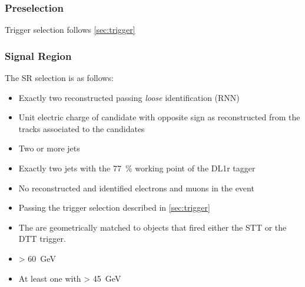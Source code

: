 \subsubsection{Preselection}

Trigger selection follows \cref{sec:trigger}

\subsubsection{Signal Region}

The SR selection is as follows:
\begin{itemize}
\item Exactly two reconstructed \tauhadvis passing \textit{loose} identification
  (RNN)

\item Unit electric charge of \tauhadvis candidate with opposite sign as
  reconstructed from the tracks associated to the \tauhadvis candidates

\item Two or more jets

\item Exactly two \btagged jets with the \SI{77}{\percent} working point of the
  DL1r tagger

\item No reconstructed and identified electrons and muons in the event

\item Passing the trigger selection described in \cref{sec:trigger}

\item The \tauhadvis are geometrically matched to objects that fired either the
  STT or the DTT trigger.

\item \mMMC > \SI{60}{\GeV}

\item At least one \bjet with \pT > \SI{45}{\GeV} 
\end{itemize}



